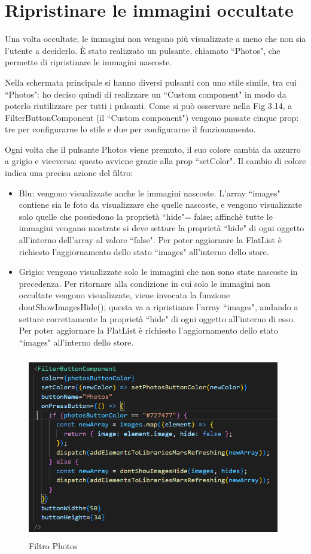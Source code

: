 \section{Ripristinare le immagini occultate}
Una volta occultate, le immagini non vengono pi\`u visualizzate a meno che non sia l'utente a deciderlo. \`E stato realizzato un pulsante, chiamato ``Photos", che permette di ripristinare le immagini nascoste.

Nella schermata principale si hanno diversi pulsanti con uno stile simile, tra cui ``Photos": ho deciso quindi di realizzare un ``Custom component" in modo da poterlo riutilizzare per tutti i pulsanti.
Come si pu\`o osservare nella Fig 3.14, a FilterButtonComponent {}(il ``Custom component") vengono passate cinque prop: tre per configurarne lo stile e due per configurarne il funzionamento.

Ogni volta che il pulsante Photos viene premuto, il suo colore cambia da azzurro a grigio e viceversa: questo avviene grazie alla prop ``setColor". 
Il cambio di colore indica una precisa azione del filtro:
\begin{itemize}
    \item Blu: vengono visualizzate anche le immagini nascoste. L'array ``images" contiene sia le foto da visualizzare che quelle nascoste, e vengono visualizzate solo quelle che possiedono la propriet\`a ``hide"= false; affinch\`e tutte le immagini vengano mostrate si deve settare la propriet\`a ``hide" 
          di ogni oggetto all'interno dell'array al valore ``false". Per poter aggiornare la FlatList \`e richiesto l'aggiornamento dello stato ``images" all'interno dello store.
    \item Grigio: vengono visualizzate solo le immagini che non sono state nascoste in precedenza.
        Per ritornare alla condizione in cui solo le immagini non occultate vengono visualizzate, viene invocata la funzione dontShowImagesHide(); questa va a ripristinare l'array ``images", andando a settare correttamente la propriet\`a ``hide" di ogni oggetto all'interno di esso.
        Per poter aggiornare la FlatList \`e richiesto l'aggiornamento dello stato ``images" all'interno dello store.
\end{itemize}

\begin{figure}[h]
    \centering
    \includegraphics[width=11cm, height=8cm]{images/photoButton.png}
    \caption[differenzeiteot]{Filtro Photos}
    \label{fig:photoButton}
\end{figure}
